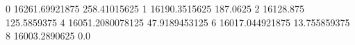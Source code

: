 0 16261.69921875 258.41015625
1 16190.3515625 187.0625
2 16128.875 125.5859375
4 16051.2080078125 47.9189453125
6 16017.044921875 13.755859375
8 16003.2890625 0.0
